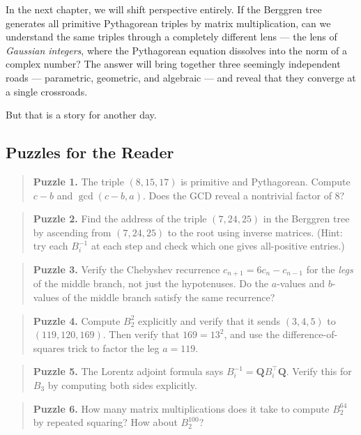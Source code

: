 \documentclass[11pt,twoside,openright]{book}
\theoremstyle{definition}
\theoremstyle{remark}
\begin{document}
In the next chapter, we will shift perspective entirely. If the Berggren tree generates all primitive Pythagorean triples by matrix multiplication, can we understand the same triples through a completely different lens --- the lens of \textit{Gaussian integers}, where the Pythagorean equation dissolves into the norm of a complex number? The answer will bring together three seemingly independent roads --- parametric, geometric, and algebraic --- and reveal that they converge at a single crossroads.

But that is a story for another day.



\subsection{Puzzles for the Reader}

\begin{quote}
\textbf{Puzzle 1.} The triple $(8, 15, 17)$ is primitive and Pythagorean. Compute $c - b$ and $\gcd(c - b, a)$. Does the GCD reveal a nontrivial factor of $8$?
\end{quote}
\begin{quote}
\textbf{Puzzle 2.} Find the address of the triple $(7, 24, 25)$ in the Berggren tree by ascending from $(7, 24, 25)$ to the root using inverse matrices. (Hint: try each $B_i^{-1}$ at each step and check which one gives all-positive entries.)
\end{quote}
\begin{quote}
\textbf{Puzzle 3.} Verify the Chebyshev recurrence $c_{n+1} = 6c_n - c_{n-1}$ for the \textit{legs} of the middle branch, not just the hypotenuses. Do the $a$-values and $b$-values of the middle branch satisfy the same recurrence?
\end{quote}
\begin{quote}
\textbf{Puzzle 4.} Compute $B_2^2$ explicitly and verify that it sends $(3, 4, 5)$ to $(119, 120, 169)$. Then verify that $169 = 13^2$, and use the difference-of-squares trick to factor the leg $a = 119$.
\end{quote}
\begin{quote}
\textbf{Puzzle 5.} The Lorentz adjoint formula says $B_i^{-1} = \mathbf{Q} B_i^\top \mathbf{Q}$. Verify this for $B_3$ by computing both sides explicitly.
\end{quote}
\begin{quote}
\textbf{Puzzle 6.} How many matrix multiplications does it take to compute $B_2^{64}$ by repeated squaring? How about $B_2^{100}$?
\end{quote}
\end{document}
